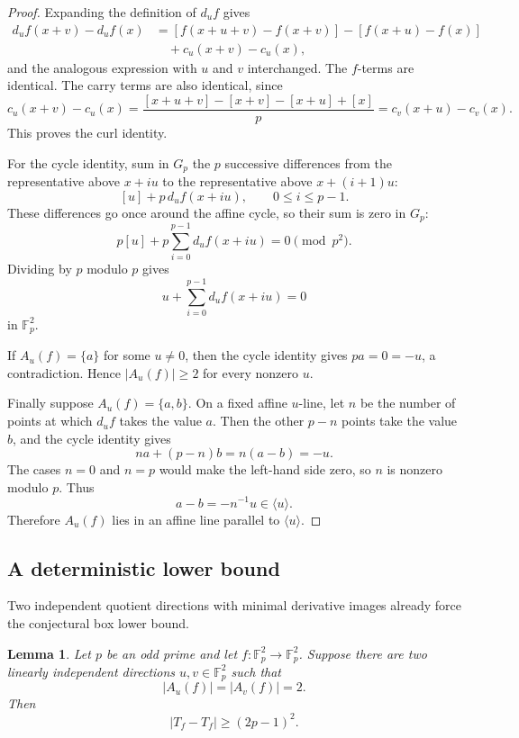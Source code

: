 \documentclass[reqno]{amsart}
\numberwithin{equation}{section}
\newtheorem{lemma}[theorem]{Lemma}
\theoremstyle{definition}
\begin{document}
\begin{proof}
Expanding the definition of $d_u f$ gives
\[
\begin{aligned}
  d_u f(x+v)-d_u f(x)
  &=[f(x+u+v)-f(x+v)]-[f(x+u)-f(x)] \\
  &\quad +c_u(x+v)-c_u(x),
\end{aligned}
\]
and the analogous expression with $u$ and $v$ interchanged.  The $f$-terms are
identical.  The carry terms are also identical, since
\[
  c_u(x+v)-c_u(x)
  =\frac{[x+u+v]-[x+v]-[x+u]+[x]}{p}
  =c_v(x+u)-c_v(x).
\]
This proves the curl identity.

For the cycle identity, sum in $G_p$ the $p$ successive differences from the
representative above $x+iu$ to the representative above $x+(i+1)u$:
\[
  [u]+p\,d_u f(x+iu),
  \qquad 0\leq i\leq p-1.
\]
These differences go once around the affine cycle, so their sum is zero in
$G_p$:
\[
  p[u]+p\sum_{i=0}^{p-1}d_u f(x+iu)=0\pmod {p^2}.
\]
Dividing by $p$ modulo $p$ gives
\[
  u+\sum_{i=0}^{p-1}d_u f(x+iu)=0
\]
in $\mathbb F_p^2$.

If $A_u(f)=\{a\}$ for some $u\neq 0$, then the cycle identity gives
$pa=0=-u$, a contradiction.  Hence $|A_u(f)|\geq 2$ for every nonzero $u$.

Finally suppose $A_u(f)=\{a,b\}$.  On a fixed affine $u$-line, let $n$ be the
number of points at which $d_u f$ takes the value $a$.  Then the other $p-n$
points take the value $b$, and the cycle identity gives
\[
  na+(p-n)b=n(a-b)=-u.
\]
The cases $n=0$ and $n=p$ would make the left-hand side zero, so $n$ is nonzero
modulo $p$.  Thus
\[
  a-b=-n^{-1}u\in\langle u\rangle.
\]
Therefore $A_u(f)$ lies in an affine line parallel to $\langle u\rangle$.
\end{proof}

\subsection{A deterministic lower bound}
\label{subsec:deterministic-square-plane-bound}

Two independent quotient directions with minimal derivative images already force
the conjectural box lower bound.

\begin{lemma}
\label{lem:two-independent-two-point-directions}
Let $p$ be an odd prime and let $f:\mathbb F_p^2\to\mathbb F_p^2$.  Suppose
there are two linearly independent directions $u,v\in\mathbb F_p^2$ such that
\[
  |A_u(f)|=|A_v(f)|=2.
\]
Then
\[
  |T_f-T_f|\geq (2p-1)^2.
\]
\end{lemma}
\end{document}
